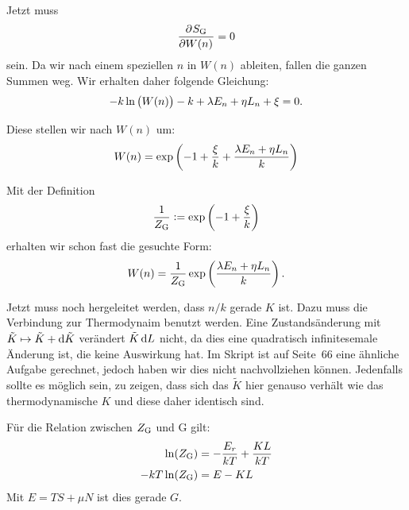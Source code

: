 Jetzt muss
\[
    \dpd{S_\text G}{W(n)} = 0
\]
sein. Da wir nach einem speziellen $n$ in $W(n)$ ableiten, fallen die ganzen Summen weg. Wir erhalten daher folgende Gleichung:
\[
    - k \ln\del{W(n)} - k + \lambda E_n + \eta L_n + \xi = 0.
\]

Diese stellen wir nach $W(n)$ um:
\[
    W(n) = \exp\del{-1 + \frac \xi k + \frac{\lambda E_n + \eta L_n}{k}}
\]

Mit der Definition
\[
    \frac 1{Z_\text G} := \exp\del{-1 + \frac \xi k}
\]
erhalten wir schon fast die gesuchte Form:
\[
    W(n) = \frac 1{Z_\text G} \exp\del{\frac{\lambda E_n + \eta L_n}{k}}.
\]

Jetzt muss noch hergeleitet werden, dass $n/k$ gerade $K$ ist. Dazu muss die
Verbindung zur Thermodynaim benutzt werden. Eine Zustandsänderung mit $\tilde K
\mapsto \tilde K + \dif \tilde K$ verändert $\tilde K \dif L$ nicht, da dies
eine quadratisch infinitesemale Änderung ist, die keine Auswirkung hat. Im
Skript ist auf Seite~66 eine ähnliche Aufgabe gerechnet, jedoch haben wir dies
nicht nachvollziehen können. Jedenfalls sollte es möglich sein, zu zeigen, dass
sich das $\tilde K$ hier genauso verhält wie das thermodynamische $K$ und diese
daher identisch sind.

Für die Relation zwischen $Z_\text G$ und G gilt:
\begin{align*}
    \ln(Z_\text G) &= - \frac{E_r}{kT} + \frac{KL}{kT} \\
    - kT \ln(Z_\text G) &= E - KL
\end{align*}
Mit $E = TS + \mu N$ ist dies gerade $G$.


